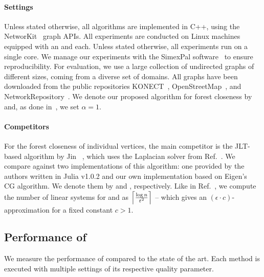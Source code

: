 \paragraph{Settings} Unless stated otherwise, all algorithms are implemented
in C++, using the NetworKit~\cite{DBLP:journals/netsci/StaudtSM16} graph APIs.
All experiments are conducted on Linux machines equipped with an \CPU
and \RAM each. Unless stated otherwise, all experiments run on a single core.
We manage our experiments with the SimexPal
software~\cite{DBLP:journals/algorithms/AngrimanGLMNPT19} to ensure
reproducibility. For evaluation, we use a large collection of undirected
graphs of different sizes, coming from a diverse set of domains. All graphs
have been downloaded from the public repositories KONECT~\cite{kunegis2013konect},
OpenStreetMap~\cite{OpenStreetMap}, and
NetworkRepository~\cite{DBLP:conf/aaai/RossiA15}.
We denote our proposed algorithm for forest closeness by \ust and,
as done in~\cite{DBLP:conf/icdm/JinBZ19}, we set $\alpha = 1$.

\paragraph{Competitors} For the forest closeness of individual
vertices, the main competitor is the JLT-based algorithm by
Jin \etal~\cite{DBLP:conf/icdm/JinBZ19}, which uses the Laplacian
solver from Ref.~\cite{DBLP:conf/focs/KyngS16}.
We compare against two implementations of this algorithm: one provided
by the authors written in Julia v1.0.2 and our own implementation
based on Eigen's~\cite{eigenweb} CG algorithm. We denote them by
\jltjulia and \jltcpp, respectively. Like in Ref.~\cite{DBLP:conf/icdm/JinBZ19},
we compute the number of linear systems for \jltjulia and \jltcpp
as $\ceil{\frac{\log n}{\epsilon^2}}$ -- which gives an
$(\epsilon\cdot c)$-approximation for a fixed constant $c > 1$.

\subsection{Performance of \ust}
We measure the performance of \ust compared to the state of the art.
Each method is executed with multiple settings of its respective quality
parameter.

